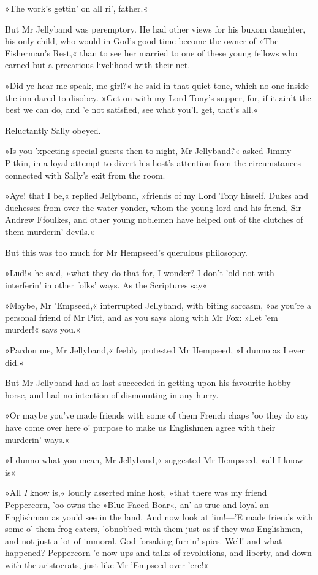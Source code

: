 »The work's gettin' on all ri', father.«

But Mr Jellyband was peremptory. He had other views for his buxom daughter, his only child, who would in God's good time become the owner of »The Fisherman's Rest,« than to see her married to one of these young fellows who earned but a precarious livelihood with their net.

»Did ye hear me speak, me girl?« he said in that quiet tone, which no one inside the inn dared to disobey. »Get on with my Lord Tony's supper, for, if it ain't the best we can do, and 'e not satisfied, see what you'll get, that's all.«

Reluctantly Sally obeyed.

»Is you 'xpecting special guests then to-night, Mr Jellyband?« asked Jimmy Pitkin, in a loyal attempt to divert his host's attention from the circumstances connected with Sally's exit from the room.

»Aye! that I be,« replied Jellyband, »friends of my Lord Tony hisself. Dukes and duchesses from over the water yonder, whom the young lord and his friend, Sir Andrew Ffoulkes, and other young noblemen have helped out of the clutches of them murderin' devils.«

But this was too much for Mr Hempseed's querulous philosophy.

»Lud!« he said, »what they do that for, I wonder? I don't 'old not with interferin' in other folks' ways. As the Scriptures say\longdash«

»Maybe, Mr 'Empseed,« interrupted Jellyband, with biting sarcasm, »as you're a personal friend of Mr Pitt, and as you says along with Mr Fox: »Let 'em murder!« says you.«

»Pardon me, Mr Jellyband,« feebly protested Mr Hempseed, »I dunno as I ever did.«

But Mr Jellyband had at last succeeded in getting upon his favourite hobby-horse, and had no intention of dismounting in any hurry.

»Or maybe you've made friends with some of them French chaps 'oo they do say have come over here o' purpose to make us Englishmen agree with their murderin' ways.«

»I dunno what you mean, Mr Jellyband,« suggested Mr Hempseed, »all I know is\longdash«

»All \textit{I} know is,« loudly asserted mine host, »that there was my friend Peppercorn, 'oo owns the »Blue-Faced Boar«, an' as true and loyal an Englishman as you'd see in the land. And now look at 'im!\allowbreak---\allowbreak 'E made friends with some o' them frog-eaters, 'obnobbed with them just as if they was Englishmen, and not just a lot of immoral, God-forsaking furrin' spies. Well! and what happened? Peppercorn 'e now ups and talks of revolutions, and liberty, and down with the aristocrats, just like Mr 'Empseed over 'ere!«

